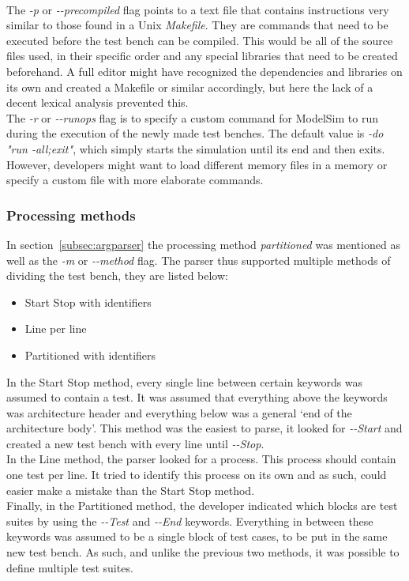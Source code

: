 \documentclass[11pt,british]{article}
\begin{document}
\\[\baselineskip]
The \emph{-p} or \emph{-\--precompiled} flag points to a text file that contains instructions very similar to those found in a Unix \emph{Makefile}. They are commands that need to be executed before the test bench can be compiled. This would be all of the source files used, in their specific order and any special libraries that need to be created beforehand. A full editor might have recognized the dependencies and libraries on its own and created a Makefile or similar accordingly, but here the lack of a decent lexical analysis prevented this.
\\[\baselineskip]
The \emph{-r} or \emph{-\--runops} flag is to specify a custom command for ModelSim to run during the execution of the newly made test benches. The default value is \emph{-do "run -all;exit"}, which simply starts the simulation until its end and then exits. However, developers might want to load different memory files in a memory or specify a custom file with more elaborate commands.

\subsubsection{Processing methods}
\label{subsubsec:processmethods}
In section~\ref{subsec:argparser} the processing method \emph{partitioned} was mentioned as well as the \emph{-m} or \emph{-\--method} flag. The parser thus supported multiple methods of dividing the test bench, they are listed below:
\begin{itemize}%
\item Start Stop with identifiers
\item Line per line 
\item Partitioned with identifiers
\end{itemize}
In the Start Stop method, every single line between certain keywords was assumed to contain a test. It was assumed that everything above the keywords was architecture header and everything below was a general `end of the architecture body'. This method was the easiest to parse, it looked for \emph{-\--Start} and created a new test bench with every line until \emph{-\--Stop}.
\\[\baselineskip]
In the Line method, the parser looked for a process. This process should contain one test per line. It tried to identify this process on its own and as such, could easier make a mistake than the Start Stop method.
\\[\baselineskip]
Finally, in the Partitioned method, the developer indicated which blocks are test suites by using the \emph{-\--Test} and \emph{-\--End} keywords. Everything in between these keywords was assumed to be a single block of test cases, to be put in the same new test bench. As such, and unlike the previous two methods, it was possible to define multiple test suites. 
\end{document}
